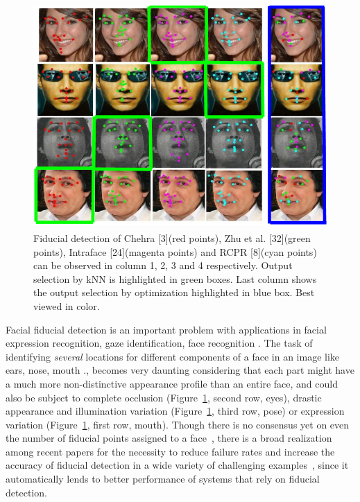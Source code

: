 \begin{figure}
    \centering
    \includegraphics[width=5.5in, height=3.4in]{fid/figures/first_page.png}
    \caption{ Fiducial detection of Chehra [3](red points), Zhu
              et al. [32](green points), Intraface [24](magenta points) and
              RCPR [8](cyan points) can be observed in column 1, 2, 3
              and 4 respectively. Output selection by kNN is highlighted
              in green boxes. Last column shows the output selection by
              optimization highlighted in blue box. Best viewed in color.}
    \label{fig:first_page}
\end{figure}

Facial fiducial detection is an important problem with applications in facial expression 
recognition, gaze identification, face recognition \etc. The task of identifying \emph{several}
locations for different components of a face in an image like ears, nose, mouth \etc., becomes
very daunting considering that each part might have a much more non-distinctive appearance
profile than an entire face, and could also be subject to complete occlusion
(Figure~\ref{fig:first_page}, second row, eyes), drastic appearance and illumination variation
(Figure~\ref{fig:first_page}, third row, pose) or expression variation
(Figure~\ref{fig:first_page}, first row, mouth).
Though there is no consensus
yet on even the number of fiducial points assigned to a face~\cite{smithECCV14_ED}, there is a
broad realization among recent papers for the necessity to reduce failure rates and increase
the accuracy of fiducial detection in a wide variety of challenging examples~\cite{smithECCV14_ED,
zhouICCV13_EGM, koetsingerBFIAT11_AFLW, kumarPAMI13_faceExem,artizzzuICCV13_COFW,yuECCV14_CoR},
since it automatically lends to better performance of systems that rely on fiducial detection.


